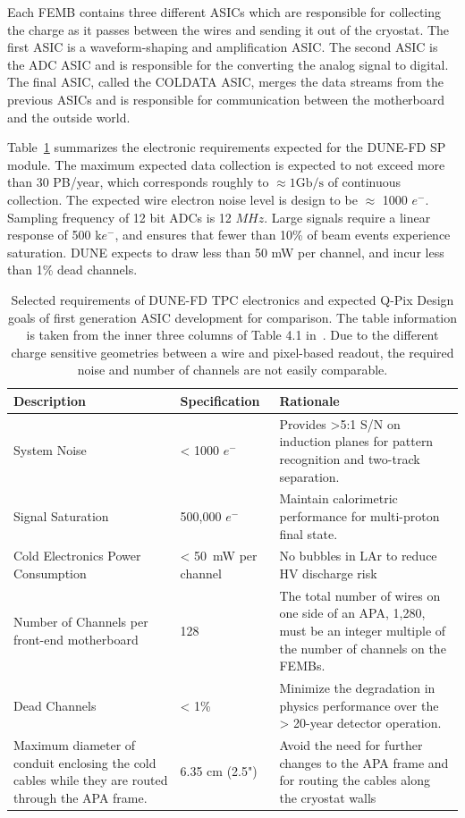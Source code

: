 Each FEMB contains three different ASICs which are responsible for collecting the charge as it passes between the wires and sending it out of the cryostat.
The first ASIC is a waveform-shaping and amplification ASIC.
The second ASIC is the ADC ASIC and is responsible for the converting the analog signal to digital.
The final ASIC, called the COLDATA ASIC, merges the data streams from the previous ASICs and is responsible for communication between the motherboard and the outside world.

Table~\ref{tab:dune_tpc_elec} summarizes the electronic requirements expected for the DUNE-FD SP module.
The maximum expected data collection is expected to not exceed more than 30 PB/year, which corresponds roughly to $\approx 1 \mathrm{Gb/s}$ of continuous collection.
The expected wire electron noise level is design to be $\approx$ 1000 $e^{-}$.
Sampling frequency of 12 bit ADCs is 12 $\unit{MHz}$.
Large signals require a linear response of 500 k$e^{-}$, and ensures that fewer than 10\% of beam events experience saturation.
DUNE expects to draw less than 50 mW per channel, and incur less than 1\% dead channels.

\begin{table}
\begin{center}
\begin{tabular}{|| p{50mm} | p{40mm} | p{60mm} ||}
 \hline
 Description & Specification & Rationale \\ [0.5ex]
 \hline\hline
  System Noise & < 1000 $e^{-}$ & Provides >5:1 S/N on induction planes for pattern recognition and two-track separation. \\
 \hline
  Signal Saturation & 500,000 $e^{-}$ & Maintain calorimetric performance for multi-proton final state. \\
 \hline
  Cold Electronics Power Consumption & < 50~\unit{mW} per channel & No bubbles in LAr to reduce HV discharge risk\\
 \hline
  Number of Channels per front-end motherboard & 128 & The total number of wires on one side of an APA, 1,280, must be an integer multiple of the number of channels on the FEMBs. \\
 \hline
  Dead Channels & < 1\% & Minimize the degradation in physics performance over the > 20-year detector operation. \\
 \hline
  Maximum diameter of conduit enclosing the cold cables while they are routed through the APA frame. & 6.35 cm (2.5") & Avoid the need for further changes to the APA frame and for routing the cables along the cryostat walls \\
 \hline
\end{tabular}
\caption{Selected requirements of DUNE-FD TPC electronics and expected Q-Pix Design goals of first generation ASIC development for comparison.
The table information is taken from the inner three columns of Table 4.1 in~\citep{DUNE-FD_TDRv4:Abi_2020}.
Due to the different charge sensitive geometries between a wire and pixel-based readout, the required noise and number of channels are not easily comparable.
}
\label{tab:dune_tpc_elec}
\end{center}
\end{table}


